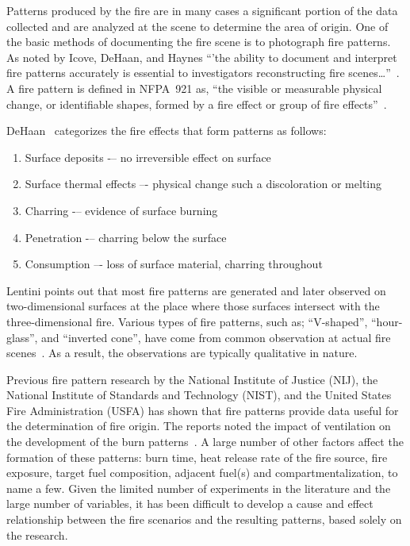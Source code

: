 \documentclass[twoside]{uocthesis}
\begin{document}
Patterns produced by the fire are in many cases a significant portion of the data collected and are analyzed at the scene to determine the area of origin.  One of the basic methods of documenting the fire scene is to photograph fire patterns.  As noted by Icove, DeHaan, and Haynes  ``'the ability to document and interpret fire patterns accurately is essential to investigators reconstructing fire scenes…''~\cite{Icove:2013}.  A fire pattern is defined in NFPA~921 as, ``the visible or measurable physical change, or identifiable shapes, formed by a fire effect or group of fire effects''~\cite{NFPA:921}.

DeHaan~\cite{DeHaan:2012} categorizes the fire effects that form patterns as follows:
\begin{enumerate}
\item Surface deposits -– no irreversible effect on surface
\item Surface thermal effects –- physical change such a discoloration or melting
\item Charring -– evidence of surface burning
\item Penetration -– charring below the surface
\item Consumption –- loss of surface material, charring throughout
\end{enumerate}
Lentini points out that most fire patterns are generated and later observed on two-dimensional surfaces at the place where those surfaces intersect with the three-dimensional fire. Various types of fire patterns, such as; ``V-shaped'', ``hour-glass'', and ``inverted cone'', have come from common observation at actual fire scenes~\cite{Lentini:2006}.  As a result, the observations are typically qualitative in nature.

Previous fire pattern research by the National Institute of Justice (NIJ), the National Institute of Standards and Technology (NIST), and the United States Fire Administration (USFA) has shown that fire patterns provide data useful for the determination of fire origin.  The reports noted the impact of ventilation on the development of the burn patterns~\cite{Shanley:1997,Putorti:1997}. A large number of other factors affect the formation of these patterns: burn time, heat release rate of the fire source, fire exposure, target fuel composition, adjacent fuel(s) and compartmentalization, to name a few. Given the limited number of experiments in the literature and the large number of variables, it has been difficult to develop a cause and effect relationship between the fire scenarios and the resulting patterns, based solely on the research.  
\end{document}

